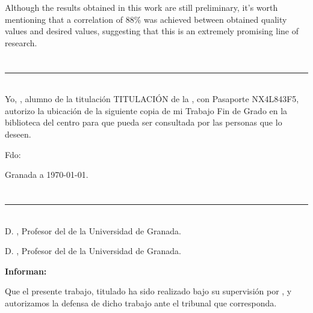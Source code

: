Although the results obtained in this work are still preliminary, 
it's worth mentioning that a correlation of 88\% was achieved between obtained 
quality values and desired values, suggesting that this is an extremely promising 
line of research.

\chapter*{}
\thispagestyle{empty}

\noindent\rule[-1ex]{\textwidth}{2pt}\\[4.5ex]

Yo, \textbf{\myName}, alumno de la titulación TITULACIÓN de la \textbf{\myFaculty}, 
con Pasaporte NX4L843F5, autorizo la ubicación de la siguiente copia de mi 
Trabajo Fin de Grado en la biblioteca del centro para que pueda ser
consultada por las personas que lo deseen.

\vspace{6cm}

\noindent Fdo: \myName

\vspace{2cm}

\begin{flushright}
Granada a \today.
\end{flushright}


\chapter*{}
\thispagestyle{empty}

\noindent\rule[-1ex]{\textwidth}{2pt}\\[4.5ex]

D. \textbf{\myProf}, Profesor del \myDepartment de la Universidad de Granada.

\vspace{0.5cm}

D. \textbf{\myOtherProf}, Profesor del \myDepartment de la Universidad de Granada.


\vspace{0.5cm}

\textbf{Informan:}

\vspace{0.5cm}

Que el presente trabajo, titulado \textit{\textbf{\myTitle}}
ha sido realizado bajo su supervisión por \textbf{\myName}, y autorizamos la defensa de dicho trabajo ante el tribunal
que corresponda.

\vspace{0.5cm}

